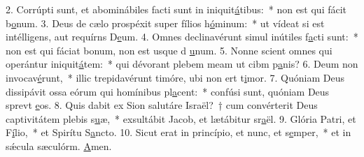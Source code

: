 2. Corrúpti sunt, et abominábiles facti sunt in iniquit\uline{á}tibus:~* non est qui fácit b\uline{o}num.
3. Deus de cælo prospéxit super fílios h\uline{ó}minum:~* ut vídeat si est intélligens, aut requírns D\uline{e}um.
4. Omnes declinavérunt simul inútiles f\uline{a}cti sunt:~* non est qui fáciat bonum, non est usque d \uline{u}num.
5. Nonne scient omnes qui operántur iniquit\uline{á}tem:~* qui dévorant plebem meam ut cibm p\uline{a}nis?
6. Deum non invocav\uline{é}runt,~* illic trepidavérunt timóre, ubi non ert t\uline{i}mor.
7. Quóniam Deus dissipávit ossa eórum qui homínibus pl\uline{a}cent:~* confúsi sunt, quóniam Deus sprevt \uline{e}os.
8. Quis dabit ex Sion salutáre Israël?~† cum convérterit Deus captivitátem plebis s\uline{u}æ,~* exsultábit Jacob, et lætábitur sr\uline{a}ël.
9. Glória Patri, et F\uline{í}lio,~* et Spirítu S\uline{a}ncto.
10. Sicut erat in princípio, et nunc, et s\uline{e}mper,~* et in sǽcula sæculórm. \uline{A}men.
